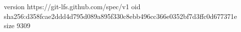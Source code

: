 version https://git-lfs.github.com/spec/v1
oid sha256:d358fcae2ddd4d795d089a895f330c8ebb496cc366e0352bf7d3ffc0d677371e
size 9309
